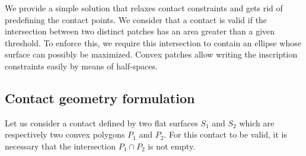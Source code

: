 We provide a simple solution that relaxes contact constraints and gets rid of predefining the contact points.
We consider that a contact is valid if the intersection between two distinct patches has an area greater than a given threshold.
To enforce this, we require this intersection to contain an ellipse whose surface can possibly be maximized.
Convex patches allow writing the inscription constraints easily by means of half-spaces.


\subsection{Contact geometry formulation}
\label{subsec:contact_geometry_formulation}


Let us consider a contact defined by two flat surfaces $S_1$ and $S_2$ which are respectively two convex polygons $P_1$ and $P_2$.
For this contact to be valid, it is necessary that the intersection $P_1 \cap P_2$ is not empty.

